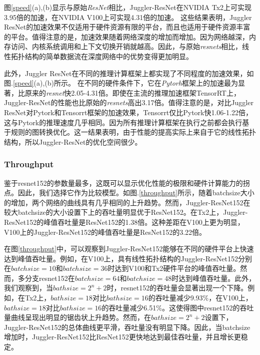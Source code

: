 图\ref{speed}(a),(b)显示与原始\emph{ResNet}相比，Juggler-ResNet在NVIDIA Tx2上可实现3.95倍的加速，在NVIDIA V100上可实现4.31倍的加速。 这些结果表明，Juggler ResNet的加速效果不仅适用于硬件资源有限的平台，而且也适用于硬件资源丰富的平台。值得注意的是，加速效果随着网络深度的增加而增加。因为网络越深，内存访问、内核系统调用和上下文切换开销就越高。因此，与原始\emph{resnets}相比，线性拓扑结构的简单数据流在深度网络中的优势变得更加明显。

此外，Juggler ResNet在不同的推理计算框架上都实现了不同程度的加速效果，如图.\ref{speed}(a),(b)所示。 在不同的硬件条件下，它在\emph{Pytorh}框架上的加速最为显著，比原来的\emph{resnet}快2.05-4.31倍。即使在主流的推理加速框架TensorRT上，Juggler-ResNet的性能也比原始的\emph{resnets}高出3.17倍。值得注意的是，对比Juggler ResNet对Pytork和Tensorrt框架的加速效果，Tensorrt仅比Pytork快1.06-1.22倍，这与Pytork的推理速度几乎相同。因为所有推理计算框架在执行之前都会执行基于规则的图转换优化。这一结果表明，由于性能的提高实际上来自于它的线性拓扑结构，所以Juggler-ResNet的优化空间很少。 

\subsubsection{Throughput}

鉴于resnet152的参数量最多，这既可以显示优化性能的极限和硬件计算能力的拐点。因此，我们选择它作为比较模型。如图.\ref{throughput}所示，随着batchsize大小的增加，两个网络的曲线具有几乎相同的上升趋势。然而，Juggler-ResNet152在较大batchsize的大小设置下上的吞吐量明显优于ResNet152。在Tx2上，Juggler-ResNet152的峰值吞吐量是ResNet152的1.38倍。这种差距在V100上更为明显，V100上的Juggler-ResNet152的峰值吞吐量是ResNet152的3.22倍。

在图\ref{throughput}中，可以观察到Juggler-ResNet152能够在不同的硬件平台上快速达到峰值吞吐量。例如，在V100上，具有线性拓扑结构的Juggler-ResNet152分别在$batchsize=10$和$batchsize=36$时达到V100和Tx2硬件平台的峰值吞吐量。然而，多分支resnet152在$batchsize=64$和$batchsize=48$时达到峰值吞吐量。此外，我们观察到，当$bathsize=2^n+2$时，resnet152的吞吐量会显著出现一个下降。例如，在Tx2上，$bathsize=18$对比$bathsize=16$的吞吐量减少9.93\%，在V100上，$bathsize=18$对比$bathsize=16$的吞吐量减少6.51\%。这使得图中resnet152的吞吐量曲线呈现出明显的锯齿状上升趋势。然而，在$bathsize=2^n+2$设置下，Juggler-ResNet152的总体曲线更平滑，吞吐量没有明显下降。因此，当batchsize增加时，Juggler-ResNet152比ResNet152更快地达到最佳吞吐量，并且增长更稳定。

